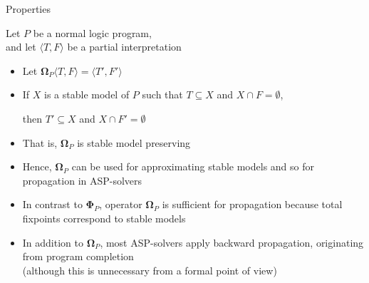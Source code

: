 \begin{frame}{Properties}

  Let $P$ be a normal logic program,\\ and
  let $\langle T,F \rangle$ be a partial interpretation

  \begin{itemize}
  \item<1-> Let ${\mathbf{\Omega}}_P\langle T,F \rangle=\langle T',F'\rangle$
  \item<2-> If $X$ is a stable model of $P$ such that $T\subseteq X$ and $X\cap F=\emptyset$,
    \par then $T'\subseteq X$ and $X\cap F'=\emptyset$
  \item<3-> [] That is, ${\mathbf{\Omega}}_P$ is \alert{stable model preserving}
  \item<3-> [] Hence, ${\mathbf{\Omega}}_P$ can be used for approximating stable models
    and so for propagation in ASP-solvers
    \medskip
  \item <4-> In contrast to ${\mathbf{\Phi}}_P$,
    operator ${\mathbf{\Omega}}_P$ is sufficient for propagation
    because total fixpoints correspond to stable models
    \medskip
  \item<5-> 
    In addition to ${\mathbf{\Omega}}_P$, most ASP-solvers apply backward
    propagation, originating from program completion
    \\
    (although this is unnecessary from a formal point of view)
  \end{itemize}
\end{frame}
